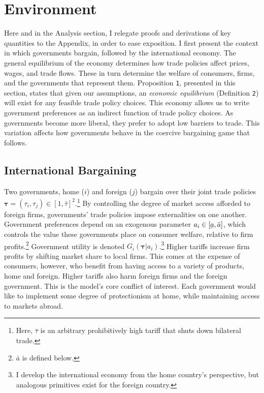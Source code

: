\documentclass{puthesis}
\DeclareRobustCommand{\ubar}[1]{\underaccent{\bar}{#1}}
\begin{document}
\section{Environment}

Here and in the Analysis section, I relegate proofs and derivations of
key quantities to the Appendix, in order to ease exposition. I first
present the context in which governments bargain, followed by the
international economy. The general equilibrium of the economy determines
how trade policies affect prices, wages, and trade flows. These in turn
determine the welfare of consumers, firms, and the governments that
represent them. Proposition \texttt{1}, presented in this section,
states that given our assumptions, an \emph{economic equilibrium}
(Definition \texttt{2}) will exist for any feasible trade policy
choices. This economy allows us to write government preferences as an
indirect function of trade policy choices. As governments become more
liberal, they prefer to adopt low barriers to trade. This variation
affects how governments behave in the coercive bargaining game that
follows.

\subsection{International Bargaining}

Two governments, home (\(i\)) and foreign (\(j\)) bargain over their
joint trade policies
\(\bm{\tau} = \left( \tau_i, \tau_j \right) \in [1, \bar{\tau}]^2\).\footnote{Here,
  \(\bar{\tau}\) is an arbitrary prohibitively high tariff that shuts
  down bilateral trade.} By controlling the degree of market access
afforded to foreign firms, governments' trade policies impose
externalities on one another. Government preferences depend on an
exogenous parameter \(a_i \in [\ubar{a}, \bar{a}]\), which controls the
value these governments place on consumer welfare, relative to firm
profits.\footnote{\(\bar{a}\) is defined below.} Government utility is
denoted \(G_i( \bm{\tau} | a_i)\).\footnote{I develop the international
  economy from the home country's perspective, but analogous primitives
  exist for the foreign country.} Higher tariffs increase firm profits
by shifting market share to local firms. This comes at the expense of
consumers, however, who benefit from having access to a variety of
products, home and foreign. Higher tariffs also harm foreign firms and
the foreign government. This is the model's core conflict of interest.
Each government would like to implement some degree of protectionism at
home, while maintaining access to markets abroad.
\end{document}

